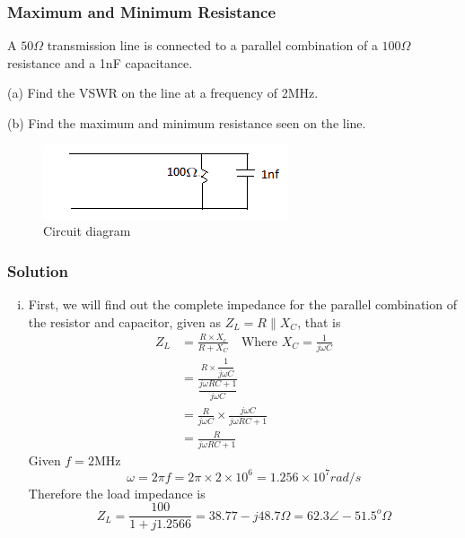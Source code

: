 \begin{exmp}
\subsubsection*{Maximum and Minimum Resistance}
A $50\Omega$ transmission line is connected to a parallel combination of a $100\Omega$ resistance and a 1nF capacitance.

(a) Find the VSWR on the line at a frequency of 2MHz.

(b) Find the maximum and minimum resistance seen on the line.

\begin{figure}[h]
\centering
\includegraphics[width=\linewidth]{./graphics/d1}
\caption{Circuit diagram}
\end{figure}

\subsubsection*{Solution}
\begin{enumerate}[(i)]
\item First, we will find out the complete impedance for the parallel combination of the resistor and capacitor, given as $Z_{L}=R\parallel X_C$, that is
\begin{align*}
Z_L&=\frac{R \times X_c}{R + X_C}\quad\text{Where }X_C =\frac{1}{j\omega C}\\
&=\frac{R\times\dfrac{1}{j\omega C}}{\dfrac{j\omega RC + 1}{j\omega C}}\\
&=\frac{R}{j\omega C} \times \frac{j \omega C}{j\omega RC + 1}\\
&=\frac{R}{j\omega RC + 1}
\end{align*}
Given $f=2$MHz
\begin{dmath*}
\omega = 2\pi f
= 2\pi \times 2 \times 10^{6}
=1.256\times 10^{7}rad/s    
\end{dmath*}
Therefore the load impedance is
\begin{dmath*}
Z_{L}=\frac{100}{1 + j1.2566}
= 38.77-j48.7\Omega
= 62.3\angle-51.5^o\Omega
\end{dmath*}


\end{enumerate}
\end{exmp}
